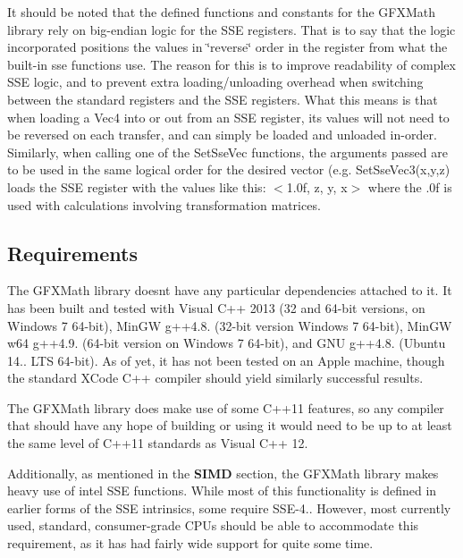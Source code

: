It should be noted that the defined functions and constants for the G\+F\+X\+Math library rely on big-\/endian logic for the S\+S\+E registers. That is to say that the logic incorporated positions the values in \char`\"{}reverse\char`\"{} order in the register from what the built-\/in sse functions use. The reason for this is to improve readability of complex S\+S\+E logic, and to prevent extra loading/unloading overhead when switching between the standard registers and the S\+S\+E registers. What this means is that when loading a {\ttfamily Vec4} into or out from an S\+S\+E register, its values will not need to be reversed on each transfer, and can simply be loaded and unloaded in-\/order. Similarly, when calling one of the {\ttfamily Set\+Sse\+Vec} functions, the arguments passed are to be used in the same logical order for the desired vector (e.\+g. {\ttfamily Set\+Sse\+Vec3(x,y,z)} loads the S\+S\+E register with the values like this\+: {\ttfamily $<$1.\+0f, z, y, x$>$} where the {.\+0f} is used with calculations involving transformation matrices.

\subsection*{Requirements}





The G\+F\+X\+Math library doesn\textquotesingle{}t have any particular dependencies attached to it. It has been built and tested with Visual C++ 2013 (32 and 64-\/bit versions, on Windows 7 64-\/bit), Min\+G\+W g++4.8. (32-\/bit version Windows 7 64-\/bit), Min\+G\+W w64 g++4.9. (64-\/bit version on Windows 7 64-\/bit), and G\+N\+U g++4.8. (Ubuntu 14.. L\+T\+S 64-\/bit). As of yet, it has not been tested on an Apple machine, though the standard X\+Code C++ compiler should yield similarly successful results.

The G\+F\+X\+Math library does make use of some C++11 features, so any compiler that should have any hope of building or using it would need to be up to at least the same level of C++11 standards as Visual C++ 12.

Additionally, as mentioned in the {\bfseries S\+I\+M\+D} section, the G\+F\+X\+Math library makes heavy use of intel\textregistered{} S\+S\+E functions. While most of this functionality is defined in earlier forms of the S\+S\+E intrinsics, some require S\+S\+E-\/4.. However, most currently used, standard, consumer-\/grade C\+P\+Us should be able to accommodate this requirement, as it has had fairly wide support for quite some time.

